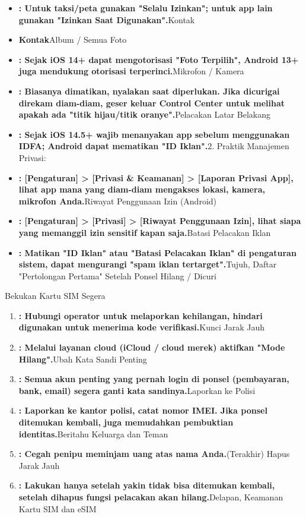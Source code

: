 \begin{itemize}
  \item \textbf{: Untuk taksi/peta gunakan "Selalu Izinkan"; untuk app lain gunakan "Izinkan Saat Digunakan".}Kontak
  \item \textbf{Kontak}Album / Semua Foto
  \item \textbf{: Sejak iOS 14+ dapat mengotorisasi "Foto Terpilih", Android 13+ juga mendukung otorisasi terperinci.}Mikrofon / Kamera
  \item \textbf{: Biasanya dimatikan, nyalakan saat diperlukan. Jika dicurigai direkam diam-diam, geser keluar Control Center untuk melihat apakah ada "titik hijau/titik oranye".}Pelacakan Latar Belakang
  \item \textbf{: Sejak iOS 14.5+ wajib menanyakan app sebelum menggunakan IDFA; Android dapat mematikan "ID Iklan".}2. Praktik Manajemen Privasi:
\end{itemize}


\begin{itemize}
  \item \textbf{: [Pengaturan] > [Privasi \& Keamanan] > [Laporan Privasi App], lihat app mana yang diam-diam mengakses lokasi, kamera, mikrofon Anda.}Riwayat Penggunaan Izin (Android)
  \item \textbf{: [Pengaturan] > [Privasi] > [Riwayat Penggunaan Izin], lihat siapa yang memanggil izin sensitif kapan saja.}Batasi Pelacakan Iklan
  \item \textbf{: Matikan "ID Iklan" atau "Batasi Pelacakan Iklan" di pengaturan sistem, dapat mengurangi "spam iklan tertarget".}Tujuh, Daftar "Pertolongan Pertama" Setelah Ponsel Hilang / Dicuri
\end{itemize}


Bekukan Kartu SIM Segera

\begin{enumerate}
  \item \textbf{: Hubungi operator untuk melaporkan kehilangan, hindari digunakan untuk menerima kode verifikasi.}Kunci Jarak Jauh
  \item \textbf{: Melalui layanan cloud (iCloud / cloud merek) aktifkan "Mode Hilang".}Ubah Kata Sandi Penting
  \item \textbf{: Semua akun penting yang pernah login di ponsel (pembayaran, bank, email) segera ganti kata sandinya.}Laporkan ke Polisi
  \item \textbf{: Laporkan ke kantor polisi, catat nomor IMEI. Jika ponsel ditemukan kembali, juga memudahkan pembuktian identitas.}Beritahu Keluarga dan Teman
  \item \textbf{: Cegah penipu meminjam uang atas nama Anda.}(Terakhir) Hapus Jarak Jauh
  \item \textbf{: Lakukan hanya setelah yakin tidak bisa ditemukan kembali, setelah dihapus fungsi pelacakan akan hilang.}Delapan, Keamanan Kartu SIM dan eSIM
\end{enumerate}

